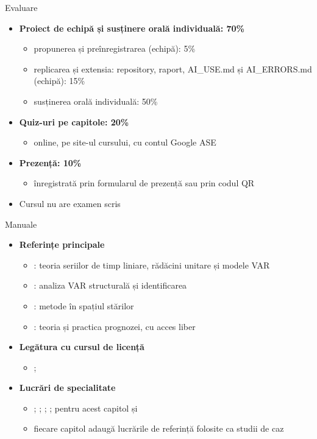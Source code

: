 \begin{frame}{Evaluare}
\itemsize{\small}
\begin{itemize}
    \item \textbf{Proiect de echipă și susținere orală individuală: 70\%}
    \begin{itemize}
        \item propunerea și preînregistrarea (echipă): 5\%
        \item replicarea și extensia: repository, raport, AI\_USE.md și AI\_ERRORS.md (echipă): 15\%
        \item susținerea orală individuală: 50\%
    \end{itemize}
    \item \textbf{Quiz-uri pe capitole: 20\%}
    \begin{itemize}
        \item online, pe site-ul cursului, cu contul Google ASE
    \end{itemize}
    \item \textbf{Prezență: 10\%}
    \begin{itemize}
        \item înregistrată prin formularul de prezență sau prin codul QR
    \end{itemize}
    \item Cursul nu are examen scris
\end{itemize}
\end{frame}

\begin{frame}{Manuale}
\itemsize{\small}
\begin{itemize}
    \item \textbf{Referințe principale}
    \begin{itemize}
        \item {}: teoria seriilor de timp liniare, rădăcini unitare și modele VAR
        \item {}: analiza VAR structurală și identificarea
        \item {}: metode în spațiul stărilor
        \item {}: teoria și practica prognozei, cu acces liber
    \end{itemize}
    \item \textbf{Legătura cu cursul de licență}
    \begin{itemize}
        \item {}; 
    \end{itemize}
    \item \textbf{Lucrări de specialitate}
    \begin{itemize}
        \item {}; ; ; ; pentru acest capitol și 
        \item fiecare capitol adaugă lucrările de referință folosite ca studii de caz
    \end{itemize}
\end{itemize}
\end{frame}

